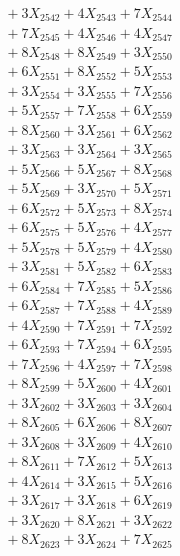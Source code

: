 \documentclass[a4paper,10pt]{article}
\begin{document}
{\begin{align}
&\;  + 3 X_{2542} + 4 X_{2543} + 7 X_{2544} \\[0.3ex]
&\;  + 7 X_{2545} + 4 X_{2546} + 4 X_{2547} \\[0.3ex]
&\;  + 8 X_{2548} + 8 X_{2549} + 3 X_{2550} \\[0.3ex]
&\;  + 6 X_{2551} + 8 X_{2552} + 5 X_{2553} \\[0.3ex]
&\;  + 3 X_{2554} + 3 X_{2555} + 7 X_{2556} \\[0.3ex]
&\;  + 5 X_{2557} + 7 X_{2558} + 6 X_{2559} \\[0.5ex]\allowbreak
&\;  + 8 X_{2560} + 3 X_{2561} + 6 X_{2562} \\[0.3ex]
&\;  + 3 X_{2563} + 3 X_{2564} + 3 X_{2565} \\[0.3ex]
&\;  + 5 X_{2566} + 5 X_{2567} + 8 X_{2568} \\[0.3ex]
&\;  + 5 X_{2569} + 3 X_{2570} + 5 X_{2571} \\[0.3ex]
&\;  + 6 X_{2572} + 5 X_{2573} + 8 X_{2574} \\[0.3ex]
&\;  + 6 X_{2575} + 5 X_{2576} + 4 X_{2577} \\[0.3ex]
&\;  + 5 X_{2578} + 5 X_{2579} + 4 X_{2580} \\[0.3ex]
&\;  + 3 X_{2581} + 5 X_{2582} + 6 X_{2583} \\[0.3ex]
&\;  + 6 X_{2584} + 7 X_{2585} + 5 X_{2586} \\[0.3ex]
&\;  + 6 X_{2587} + 7 X_{2588} + 4 X_{2589} \\[0.5ex]\allowbreak
&\;  + 4 X_{2590} + 7 X_{2591} + 7 X_{2592} \\[0.3ex]
&\;  + 6 X_{2593} + 7 X_{2594} + 6 X_{2595} \\[0.3ex]
&\;  + 7 X_{2596} + 4 X_{2597} + 7 X_{2598} \\[0.3ex]
&\;  + 8 X_{2599} + 5 X_{2600} + 4 X_{2601} \\[0.3ex]
&\;  + 3 X_{2602} + 3 X_{2603} + 3 X_{2604} \\[0.3ex]
&\;  + 8 X_{2605} + 6 X_{2606} + 8 X_{2607} \\[0.3ex]
&\;  + 3 X_{2608} + 3 X_{2609} + 4 X_{2610} \\[0.3ex]
&\;  + 8 X_{2611} + 7 X_{2612} + 5 X_{2613} \\[0.3ex]
&\;  + 4 X_{2614} + 3 X_{2615} + 5 X_{2616} \\[0.3ex]
&\;  + 3 X_{2617} + 3 X_{2618} + 6 X_{2619} \\[0.5ex]\allowbreak
&\;  + 3 X_{2620} + 8 X_{2621} + 3 X_{2622} \\[0.3ex]
&\;  + 8 X_{2623} + 3 X_{2624} + 7 X_{2625} \\[0.3ex]

\end{align}}
\end{document}
